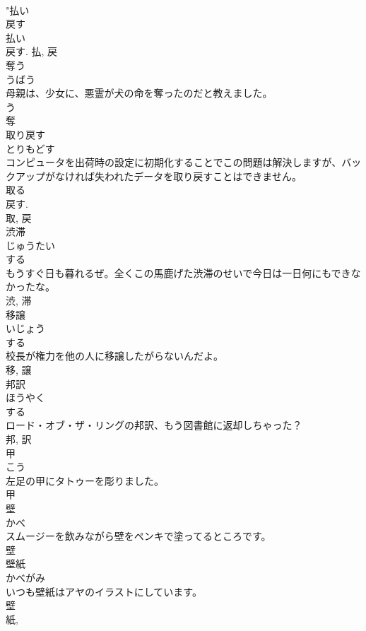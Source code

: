 \documentclass[8pt]{extreport}
\begin{document}
\begin{CJK}{UTF8}{min}
\\	"払い 
\\	戻す 
\\	払い 
\\	戻す.	払, 戻	
\\	奪う	
\\	うばう	
\\	母親は、少女に、悪霊が犬の命を奪ったのだと教えました。	
\\	う 
\\	奪	
\\	取り戻す	
\\	とりもどす	
\\	コンピュータを出荷時の設定に初期化することでこの問題は解決しますが、バックアップがなければ失われたデータを取り戻すことはできません。	
\\	取る 
\\	戻す. 
\\	取, 戻	
\\	渋滞	
\\	じゅうたい	
\\	する 
\\	もうすぐ日も暮れるぜ。全くこの馬鹿げた渋滞のせいで今日は一日何にもできなかったな。	
\\	渋, 滞	
\\	移譲	
\\	いじょう	
\\	する 
\\	校長が権力を他の人に移譲したがらないんだよ。	
\\	移, 譲	
\\	邦訳	
\\	ほうやく	
\\	する 
\\	ロード・オブ・ザ・リングの邦訳、もう図書館に返却しちゃった？	
\\	邦, 訳	
\\	甲	
\\	こう	
\\	左足の甲にタトゥーを彫りました。	
\\	甲	
\\	壁	
\\	かべ	
\\	スムージーを飲みながら壁をペンキで塗ってるところです。	
\\	壁	
\\	壁紙	
\\	かべがみ	
\\	いつも壁紙はアヤのイラストにしています。	
\\	壁 
\\	紙, 

\end{CJK}
\end{document}
